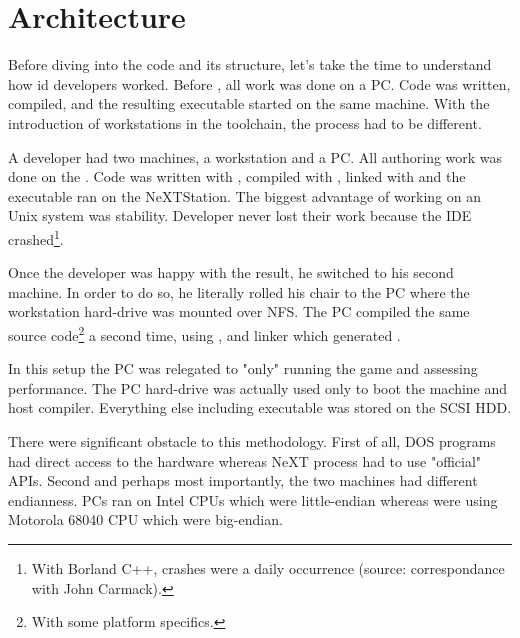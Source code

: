 \section{Architecture}
Before diving into the code and its structure, let's take the time to understand how id developers worked. Before \doom, all work was done on a PC. Code was written, compiled, and the resulting executable started on the same machine. With the introduction of \NeXT workstations in the toolchain, the process had to be different.\\
\par
A developer had two machines, a \NeXT workstation and a PC. All authoring work was done on the \NeXT. Code was written with , compiled with , linked with  and the executable ran on the NeXTStation. The biggest advantage of working on an Unix system was stability. Developer never lost their work because the IDE crashed\footnote{With Borland C++, crashes were a daily occurrence (source: correspondance with John Carmack).}.\\
\par
Once the developer was happy with the result, he switched to his second machine. In order to do so, he literally rolled his chair to the PC where the \NeXT workstation hard-drive was mounted over NFS. The PC compiled the same source code\footnote{With some platform specifics.} a second time, using , and  linker which generated . \\
\par
 In this setup the PC was relegated to "only" running the game and assessing performance. The PC hard-drive was actually used only to boot the machine and host  compiler. Everything else including  executable was stored on the \NeXT SCSI HDD.\\
\par
There were significant obstacle to this methodology. First of all, DOS programs had direct access to the hardware whereas NeXT process had to use "official" APIs. Second and perhaps most importantly, the two machines had different endianness. PCs ran on Intel CPUs which were little-endian whereas \NeXT were using Motorola 68040 CPU which were big-endian.\\
\vspace{2mm}
\par
\begin{figure}[H]
\centering
{}
\end{figure}
\par



